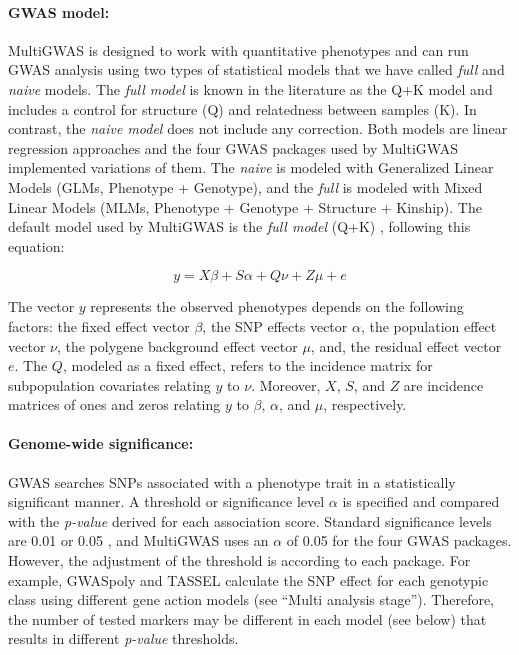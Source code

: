 \documentclass{article}
\begin{document}
\paragraph{GWAS model:}
MultiGWAS is designed to work with quantitative phenotypes and can run GWAS analysis using two types of statistical models that we have called \emph{full} and \emph{naive} models. The \emph{full model} is known in the literature as the Q+K model \cite{Yu2006} and includes a control for structure (Q) and relatedness between samples (K). In contrast, the \emph{naive model} does not include any correction. Both models are  
linear regression approaches and the four GWAS packages used by MultiGWAS implemented variations of them. The \emph{naive} is modeled with Generalized Linear Models (GLMs, Phenotype + Genotype), and the \emph{full} is modeled with Mixed Linear Models (MLMs, Phenotype + Genotype + Structure + Kinship). The default model used by MultiGWAS is the \emph{full model} (Q+K) \cite{Yu2006}, following this equation:

\[
y=X\beta+S\alpha+Q\nu+Z\mu+e
\]

The vector $y$ represents the observed phenotypes depends on the following factors: the fixed effect vector $\beta$,  the SNP effects vector $\alpha$, the population effect vector $\nu$, the polygene background effect vector $\mu$, and, the residual effect vector $e$. The $Q$, modeled as a fixed effect, refers to the incidence matrix for subpopulation covariates relating $y$ to $\nu$. Moreover, $X$, $S$, and $Z$ are incidence matrices of ones and zeros relating $y$ to $\beta$, $\alpha$, and $\mu$, respectively.

\paragraph{Genome-wide significance: }
GWAS searches SNPs associated with a phenotype trait in a statistically significant manner. A threshold or significance level $\alpha$ is specified and compared with the \emph{p-value} derived for each association score. Standard significance levels are 0.01 or 0.05 \cite{Gumpinger2018,Rosyara2016}, and MultiGWAS uses an $\alpha$ of 0.05 for the four GWAS packages. However, the adjustment of the threshold is according to each package. For example, GWASpoly and TASSEL calculate the SNP effect for each genotypic class using different gene action models (see ``Multi analysis stage''). Therefore, the number of tested markers\emph{ }may be different in each model (see below) that results in different \emph{p-value} thresholds.
\end{document}
